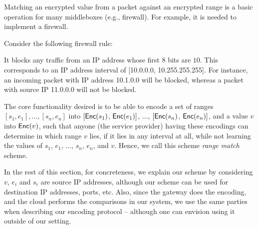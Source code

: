 Matching an encrypted value from a packet against an encrypted range is a basic operation for many middleboxes (e.g., firewall). 
For example, it is needed to implement a firewall. 

 Consider the following firewall rule:

\smallskip
{}


\noindent It blocks any traffic from an IP address whose first 8 bits are $10$. This corresponds to an IP address interval of 
[10.0.0.0, 10.255.255.255].
For instance, an incoming packet with IP address 10.1.0.0 will be blocked, whereas a packet with source IP 11.0.0.0 will not be blocked.


The core functionality desired is to be able to encode a set of ranges $[s_1, e_1], \dots, [s_n, e_n]$ into  $[\mathsf{Enc}(s_1)$, $\mathsf{Enc}(e_1)]$, $\dots$, $[\mathsf{Enc}(s_n)$,  $\mathsf{Enc}(e_n)]$, and a value $v$ into $\mathsf{Enc}(v)$, such that anyone (the service provider) having these encodings can determine in which range $v$ lies, if it lies in any interval at all, while not learning the values of $s_1$, $e_1$, $\dots$, $s_n$, $e_n$, and $v$. Hence, we call this scheme {\em range match} scheme. 

In the rest of this section, for concreteness, we explain our scheme by considering $v$, $e_i$ and $s_i$ are source IP addresses, although our scheme can be used for destination IP addresses, ports, etc. Also, since the gateway does the encoding, and the cloud performs the comparisons in our system, we use the same parties when describing our encoding protocol -- although one can envision using it outside of our setting. 


